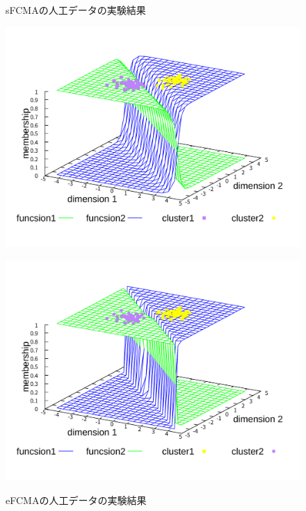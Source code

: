 \documentclass[twocolumn, a4paper]{icethesisabst}
\begin{document}
\begin{figure}[htbp]
\begin{minipage}{0.43\hsize}
  \label{fig:sFCMA-Em11}
 \end{minipage}
 \vspace*{0.5cm}
 \caption{sFCMAの人工データの実験結果}
\end{figure}

\begin{figure}[htbp]
 \centering
 \begin{minipage}{0.43\hsize}
  \includegraphics[width=\linewidth]{eFCMA-Lambda1.pdf}
  \label{fig:eFCMA-Lambda1}
 \end{minipage}
 \begin{minipage}{0.43\hsize}
  \includegraphics[width=\linewidth]{eFCMA-Lambda10.pdf}
  \label{fig:eFCMA-Lambda10}
 \end{minipage}
 \vspace*{0.5cm}
 \caption{eFCMAの人工データの実験結果}
\end{figure}
\end{document}
